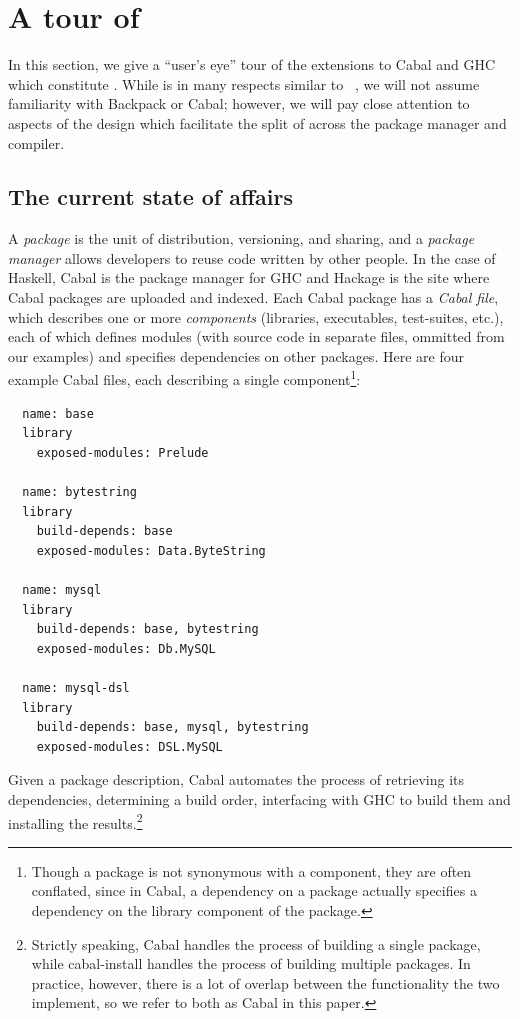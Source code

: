 \chapter{A tour of \Backpack{}}
\label{sec:tour}

In this section, we give a ``user's eye'' tour of the extensions to
Cabal and GHC which constitute \Backpack{}.  While \Backpack{} is in
many respects similar to \OldBackpack{}~\cite{backpack}, we will not assume
familiarity with Backpack or Cabal; however, we will pay close attention
to aspects of the design which facilitate the split of \Backpack{}
across the package manager and compiler.

\section{The current state of affairs}

A \emph{package} is the unit of distribution, versioning, and sharing,
and a \emph{package manager} allows developers to reuse code
written by other people.  In the case of Haskell, Cabal is the package manager for GHC
and Hackage is the site where Cabal packages are uploaded and indexed.
Each Cabal package has a \emph{Cabal file}, which describes
one or more \emph{components} (libraries, executables, test-suites, etc.), each of which
defines modules (with source code in separate files, ommitted from our examples) and specifies dependencies on other packages.  Here are four
example Cabal files, each describing a single component\footnote{
Though a package is not synonymous with a component, they are
often conflated, since in Cabal, a dependency on a package actually
specifies a dependency on the library component of the package.}:

\begin{verbatim}
  name: base
  library
    exposed-modules: Prelude

  name: bytestring
  library
    build-depends: base
    exposed-modules: Data.ByteString

  name: mysql
  library
    build-depends: base, bytestring
    exposed-modules: Db.MySQL

  name: mysql-dsl
  library
    build-depends: base, mysql, bytestring
    exposed-modules: DSL.MySQL
\end{verbatim}
%
Given a package description, Cabal automates the process of retrieving
its dependencies, determining a build order, interfacing with
GHC to build them and installing the results.\footnote{Strictly speaking,
Cabal handles the process of building a single package, while
cabal-install handles the process of building multiple packages.  In
practice, however, there is a lot of overlap between the functionality the two
implement, so we refer to both as Cabal in this paper.}

